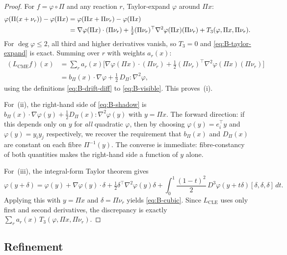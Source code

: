 \documentclass[11pt,a4paper]{article}
\numberwithin{equation}{section}
\theoremstyle{thmcompact}
\theoremstyle{remark}
\begin{document}
\begin{proof}
For $f = \varphi \circ \Pi$ and any reaction $r$, Taylor-expand $\varphi$ around $\Pi x$:
\begin{align}
\varphi(\Pi(x + \nu_r)) - \varphi(\Pi x) &= \varphi(\Pi x + \Pi\nu_r) - \varphi(\Pi x) \notag \\
&= \nabla\varphi(\Pi x) \cdot (\Pi\nu_r) + \tfrac{1}{2}(\Pi\nu_r)^\top \nabla^2\varphi(\Pi x)(\Pi\nu_r) + T_3(\varphi, \Pi x, \Pi\nu_r). \label{eq:B-taylor-expand}
\end{align}
For $\deg \varphi \leq 2$, all third and higher derivatives vanish, so $T_3 = 0$ and \eqref{eq:B-taylor-expand} is exact. Summing over $r$ with weights $a_r(x)$:
\[
\begin{aligned}
(L_{\mathrm{CME}} f)(x)
&= \sum_r a_r(x)\bigl[\nabla\varphi(\Pi x) \cdot (\Pi\nu_r)
+ \tfrac{1}{2}(\Pi\nu_r)^\top \nabla^2\varphi(\Pi x)(\Pi\nu_r)\bigr] \\
&= b_\Pi(x) \cdot \nabla\varphi
+ \tfrac{1}{2}\, D_\Pi : \nabla^2\varphi,
\end{aligned}
\]
using the definitions \eqref{eq:B-drift-diff} to \eqref{eq:B-visible}. This proves~(i).

For~(ii), the right-hand side of \eqref{eq:B-shadow} is $b_\Pi(x) \cdot \nabla\varphi(y) + \tfrac{1}{2}D_\Pi(x):\nabla^2\varphi(y)$ with $y = \Pi x$. The forward direction: if this depends only on $y$ for \emph{all} quadratic $\varphi$, then by choosing $\varphi(y) = e_i^\top y$ and $\varphi(y) = y_i y_j$ respectively, we recover the requirement that $b_\Pi(x)$ and $D_\Pi(x)$ are constant on each fibre $\Pi^{-1}(y)$. The converse is immediate: fibre-constancy of both quantities makes the right-hand side a function of $y$ alone.

For~(iii), the integral-form Taylor theorem gives
\[
\varphi(y+\delta)=\varphi(y)+\nabla\varphi(y)\cdot\delta+\tfrac12\delta^\top\nabla^2\varphi(y)\delta+\int_0^1 \frac{(1-t)^2}{2}\,D^3\varphi(y+t\delta)[\delta,\delta,\delta] \,dt.
\]
Applying this with $y=\Pi x$ and $\delta=\Pi\nu_r$ yields \eqref{eq:B-cubic}. Since $L_{\mathrm{CLE}}$ uses only first and second derivatives, the discrepancy is exactly $\sum_r a_r(x)\, T_3(\varphi, \Pi x, \Pi\nu_r)$.
\end{proof}

\subsection{Refinement}
\end{document}
